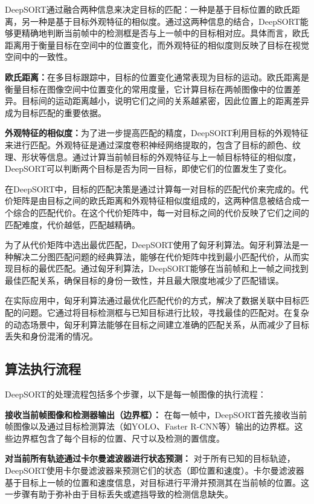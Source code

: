 DeepSORT通过融合两种信息来决定目标的匹配：一种是基于目标位置的欧氏距离，另一种是基于目标外观特征的相似度。通过这两种信息的结合，DeepSORT能够更精确地判断当前帧中的检测框是否与上一帧中的目标相对应。具体而言，欧氏距离用于衡量目标在空间中的位置变化，而外观特征的相似度则反映了目标在视觉空间中的一致性。

\textbf{欧氏距离：}在多目标跟踪中，目标的位置变化通常表现为目标的运动。欧氏距离是衡量目标在图像空间中位置变化的常用度量，它计算目标在两帧图像中的位置差异。目标间的运动距离越小，说明它们之间的关系越紧密，因此位置上的距离差异成为目标匹配的重要依据。

\textbf{外观特征的相似度：}为了进一步提高匹配的精度，DeepSORT利用目标的外观特征来进行匹配。外观特征是通过深度卷积神经网络提取的，包含了目标的颜色、纹理、形状等信息。通过计算当前帧目标的外观特征与上一帧目标特征的相似度，DeepSORT可以判断两个目标是否为同一目标，即使它们的位置发生了变化。

在DeepSORT中，目标的匹配决策是通过计算每一对目标的匹配代价来完成的。代价矩阵是由目标之间的欧氏距离和外观特征相似度组成的，这两种信息被结合成一个综合的匹配代价。在这个代价矩阵中，每一对目标之间的代价反映了它们之间的匹配难度，代价越低，匹配越精确。

为了从代价矩阵中选出最优匹配，DeepSORT使用了匈牙利算法。匈牙利算法是一种解决二分图匹配问题的经典算法，能够在代价矩阵中找到最小匹配代价，从而实现目标的最优匹配。通过匈牙利算法，DeepSORT能够在当前帧和上一帧之间找到最佳匹配关系，确保目标的身份一致性，并且最大限度地减少了匹配错误。

在实际应用中，匈牙利算法通过最优化匹配代价的方式，解决了数据关联中目标匹配的问题。它通过将目标检测框与已知目标进行比较，寻找最佳的匹配对。在复杂的动态场景中，匈牙利算法能够在目标之间建立准确的匹配关系，从而减少了目标丢失和身份混淆的情况。

\subsection{算法执行流程}

DeepSORT的处理流程包括多个步骤，以下是每一帧图像的执行流程：

\textbf{接收当前帧图像和检测器输出（边界框）： }在每一帧中，DeepSORT首先接收当前帧图像以及通过目标检测算法（如YOLO、Faster R-CNN等）输出的边界框。这些边界框包含了每个目标的位置、尺寸以及检测的置信度。

\textbf{对当前所有轨迹通过卡尔曼滤波器进行状态预测： }对于所有已知的目标轨迹，DeepSORT使用卡尔曼滤波器来预测它们的状态（即位置和速度）。卡尔曼滤波器基于目标上一帧的位置和速度信息，对目标进行平滑并预测其在当前帧的位置。这一步骤有助于弥补由于目标丢失或遮挡导致的检测信息缺失。

